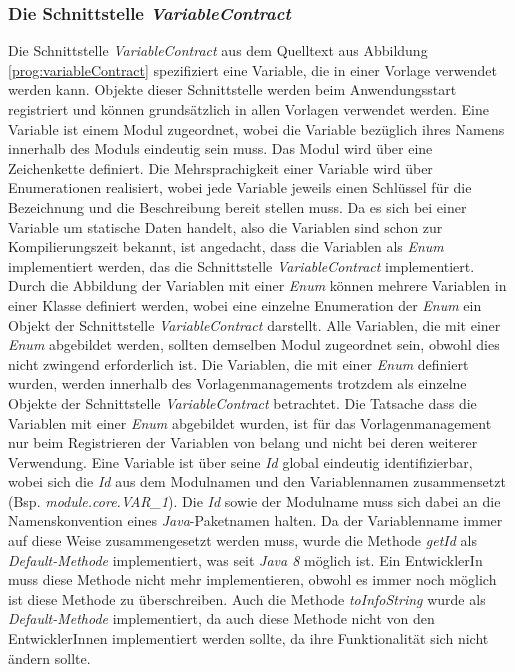 \subsubsection{Die Schnittstelle \emph{VariableContract}}
\label{sec:variableContract}
Die Schnittstelle \emph{VariableContract} aus dem Quelltext aus Abbildung \ref{prog:variableContract} spezifiziert eine Variable, die in einer Vorlage verwendet werden kann. Objekte dieser Schnittstelle werden beim Anwendungsstart registriert und können grundsätzlich in allen Vorlagen verwendet werden. Eine Variable ist einem Modul zugeordnet, wobei die Variable bezüglich ihres Namens innerhalb des Moduls eindeutig sein muss. Das Modul wird über eine Zeichenkette definiert. Die Mehrsprachigkeit einer Variable wird über Enumerationen realisiert, wobei jede Variable jeweils einen Schlüssel für die Bezeichnung und die Beschreibung bereit stellen muss.
\newline
\newline
Da es sich bei einer Variable um statische Daten handelt, also die Variablen sind schon zur Kompilierungszeit bekannt, ist angedacht, dass die Variablen als \emph{Enum} implementiert werden, das die Schnittstelle \emph{VariableContract} implementiert. Durch die Abbildung der Variablen mit einer \emph{Enum} können mehrere Variablen in einer Klasse definiert werden, wobei eine einzelne Enumeration der \emph{Enum} ein Objekt der Schnittstelle \emph{VariableContract} darstellt. Alle Variablen, die mit einer \emph{Enum} abgebildet werden, sollten demselben Modul zugeordnet sein, obwohl dies nicht zwingend erforderlich ist. Die Variablen, die mit einer \emph{Enum} definiert wurden, werden innerhalb des Vorlagenmanagements trotzdem als einzelne Objekte der Schnittstelle \emph{VariableContract} betrachtet. Die Tatsache dass die Variablen mit einer \emph{Enum} abgebildet wurden, ist für das Vorlagenmanagement nur beim Registrieren der Variablen von belang und nicht bei deren weiterer Verwendung.
\newline
\newline
Eine Variable ist über seine \emph{Id} global eindeutig identifizierbar, wobei sich die \emph{Id} aus dem Modulnamen und den Variablennamen zusammensetzt (Bsp. \emph{module.core.VAR\_1}). Die \emph{Id} sowie der Modulname muss sich dabei an die Namenskonvention eines \emph{Java}-Paketnamen halten. Da der Variablenname immer auf diese Weise zusammengesetzt werden muss, wurde die Methode \emph{getId} als \emph{Default-Methode} implementiert, was seit \emph{Java 8} möglich ist. Ein EntwicklerIn muss diese Methode nicht mehr implementieren, obwohl es immer noch möglich ist diese Methode zu überschreiben. Auch die Methode \emph{toInfoString} wurde als \emph{Default-Methode} implementiert, da auch diese Methode nicht von den EntwicklerInnen implementiert werden sollte, da ihre Funktionalität sich nicht ändern sollte.
\newpage

